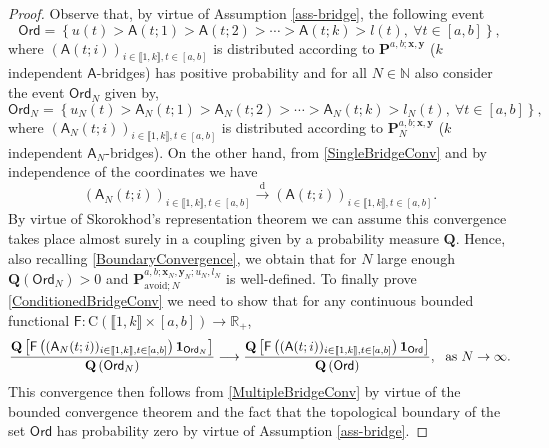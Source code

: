 \documentclass[]{article}
\begin{document}
\begin{proof}
Observe that, by virtue of Assumption \ref{ass-bridge}, the following event
\begin{equation*}
\mathsf{Ord}= \left\{u(t)>\mathsf{A}(t;1)>\mathsf{A}(t;2)>\cdots >\mathsf{A}(t;k)>l(t), \ \forall t \in [a,b]\right\},
\end{equation*}
where $(\mathsf{A}(t;i))_{i\in \llbracket 1, k\rrbracket,t \in [a,b]}$ is distributed according to $\mathbf{P}^{a,b;\mathbf{x},\mathbf{y}}$ ($k$ independent $\mathsf{A}$-bridges) has positive probability and for all $N \in \mathbb{N}$ also consider the event $\mathsf{Ord}_N$ given by,
\begin{equation}
\mathsf{Ord}_N=\left\{u_N(t)>\mathsf{A}_N(t;1)>\mathsf{A}_N(t;2)>\cdots >\mathsf{A}_N(t;k)>l_N(t), \ \forall t \in [a,b]\right\},
\end{equation}
where $(\mathsf{A}_N(t;i))_{i\in \llbracket 1, k\rrbracket,t \in [a,b]}$ is distributed according to $\mathbf{P}_N^{a,b;\mathbf{x},\mathbf{y}}$
($k$ independent $\mathsf{A}_N$-bridges). On the other hand, from \eqref{SingleBridgeConv} and by independence of the coordinates we have
\begin{equation}\label{MultipleBridgeConv}
 (\mathsf{A}_N(t;i))_{i\in \llbracket 1, k\rrbracket,t \in [a,b]} \overset{\mathrm{d}}\longrightarrow  (\mathsf{A}(t;i))_{i\in \llbracket 1, k\rrbracket,t \in [a,b]}.
\end{equation}
By virtue of Skorokhod's representation theorem we can assume this convergence takes place almost surely in a coupling given by a probability measure $\mathbf{Q}$. Hence, also recalling \eqref{BoundaryConvergence}, we obtain that for $N$ large enough $\mathbf{Q}(\mathsf{Ord}_N)>0$ and  $\mathbf{P}_{\mathrm{avoid};N}^{a,b;\mathbf{x}_N,\mathbf{y}_N;u_N,l_N}$ is well-defined. To finally prove \eqref{ConditionedBridgeConv} we need to show that for any continuous bounded functional $\mathsf{F}:\mathrm{C}(\llbracket 1, k \rrbracket \times [a,b])\to \mathbb{R}_+$,
\begin{equation*}
\frac{\mathbf{Q}\left[\mathsf{F}\left((\mathsf{A}_N(t;i))_{i\in \llbracket 1, k\rrbracket,t \in [a,b]} \right)\mathbf{1}_{\mathsf{Ord}_N}\right]}{\mathbf{Q}\left(\mathsf{Ord}_N\right)} \longrightarrow \frac{\mathbf{Q}\left[\mathsf{F}\left((\mathsf{A}(t;i))_{i\in \llbracket 1, k\rrbracket,t \in [a,b]} \right)\mathbf{1}_{\mathsf{Ord}}\right]}{\mathbf{Q}\left(\mathsf{Ord}\right)}, \ \textnormal{ as } N \to \infty.
\end{equation*}
This convergence then follows from \eqref{MultipleBridgeConv} by virtue of the bounded convergence theorem and the fact that the topological boundary of the set $\mathsf{Ord}$ has probability zero by virtue of Assumption \ref{ass-bridge}.
\end{proof}
\end{document}
